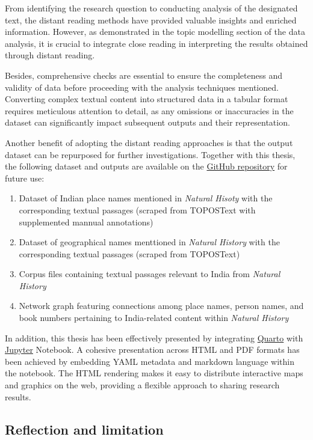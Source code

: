 \documentclass[
  12pt,
]{article}
\begin{document}
From identifying the research question to conducting analysis of the
designated text, the distant reading methods have provided valuable
insights and enriched information. However, as demonstrated in the topic
modelling section of the data analysis, it is crucial to integrate close
reading in interpreting the results obtained through distant reading.

Besides, comprehensive checks are essential to ensure the completeness
and validity of data before proceeding with the analysis techniques
mentioned. Converting complex textual content into structured data in a
tabular format requires meticulous attention to detail, as any omissions
or inaccuracies in the dataset can significantly impact subsequent
outputs and their representation.

Another benefit of adopting the distant reading approaches is that the
output dataset can be repurposed for further investigations. Together
with this thesis, the following dataset and outputs are available on the
\href{https://github.com/lizaodawn/NH_thesis}{GitHub repository} for
future use:

\begin{enumerate}
\def\labelenumi{\arabic{enumi}.}
\item
  Dataset of Indian place names mentioned in \emph{Natural Hisoty} with
  the corresponding textual passages (scraped from TOPOSText with
  supplemented mannual annotations)
\item
  Dataset of geographical names menttioned in \emph{Natural History}
  with the corresponding textual passages (scraped from TOPOSText)
\item
  Corpus files containing textual passages relevant to India from
  \emph{Natural History}
\item
  Network graph featuring connections among place names, person names,
  and book numbers pertaining to India-related content within
  \emph{Natural History}
\end{enumerate}

In addition, this thesis has been effectively presented by integrating
\href{https://quarto.org/}{Quarto} with
\href{https://jupyter.org/}{Jupyter} Notebook. A cohesive presentation
across HTML and PDF formats has been achieved by embedding YAML metadata
and markdown language within the notebook. The HTML rendering makes it
easy to distribute interactive maps and graphics on the web, providing a
flexible approach to sharing research results.

\hypertarget{reflection-and-limitation}{%
\subsection{Reflection and limitation}\label{reflection-and-limitation}}
\end{document}
